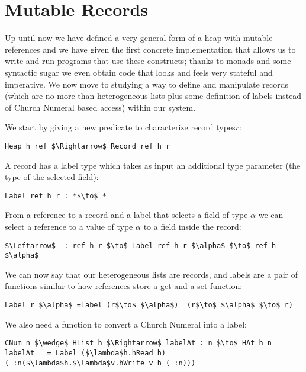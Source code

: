\documentclass[a4paper]{article}
\begin{document}

\noindent 
\section{Mutable Records}

\noindent Up until now we have defined a very general form of a heap with mutable references and we have given the first concrete implementation that allows us to write and run programs that use these constructs; thanks to monads and some syntactic sugar we even obtain code that looks and feels very stateful and imperative. We now move to studying a way to define and manipulate records (which are no more than heterogeneous lists plus some definition of labels instead of Church Numeral based access) within our system.

\noindent We start by giving a new predicate to characterize record types$ r$:

\begin{lstlisting}
Heap h ref $\Rightarrow$ Record ref h r 
\end{lstlisting}

A record has a label type which takes as input an additional type parameter (the type of the selected field):

\begin{lstlisting}
Label ref h r : *$\to$ * 
\end{lstlisting}

From a reference to a record and a label that selects a field of type $\alpha$ we can select a reference to a value of type $\alpha$ to a field inside the record:

\begin{lstlisting}
$\Leftarrow$  : ref h r $\to$ Label ref h r $\alpha$ $\to$ ref h $\alpha$  
\end{lstlisting}

We can now say that our heterogeneous lists are records, and labels are a pair of functions similar to how references store a get and a set function:

\begin{lstlisting}
Label r $\alpha$ =Label (r$\to$ $\alpha$)  (r$\to$ $\alpha$ $\to$ r)
\end{lstlisting}

We also need a function to convert a Church Numeral into a label:

\begin{lstlisting}
CNum n $\wedge$ HList h $\Rightarrow$ labelAt : n $\to$ HAt h n
labelAt _ = Label ($\lambda$h.hRead h) (_:n($\lambda$h.$\lambda$v.hWrite v h (_:n)))
\end{lstlisting}
\end{document}
